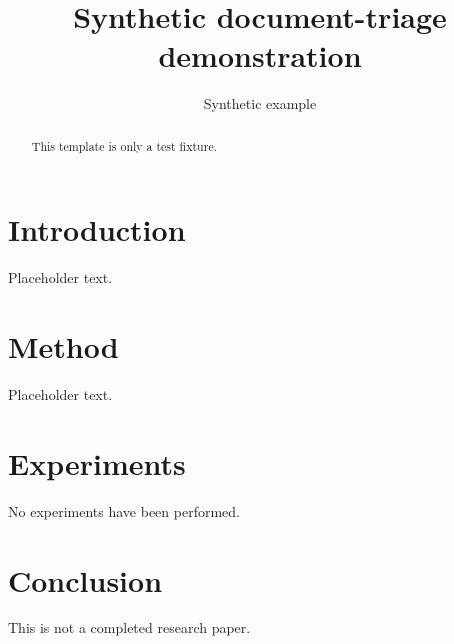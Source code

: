 \documentclass[10pt,letterpaper]{article}
\title{Synthetic document-triage demonstration}
\author{Synthetic example}
\date{}
\begin{document}
\maketitle
\begin{abstract}
This template is only a test fixture.
\end{abstract}
\section{Introduction}
Placeholder text.
\section{Method}
Placeholder text.
\section{Experiments}
No experiments have been performed.
\section{Conclusion}
This is not a completed research paper.
\end{document}
